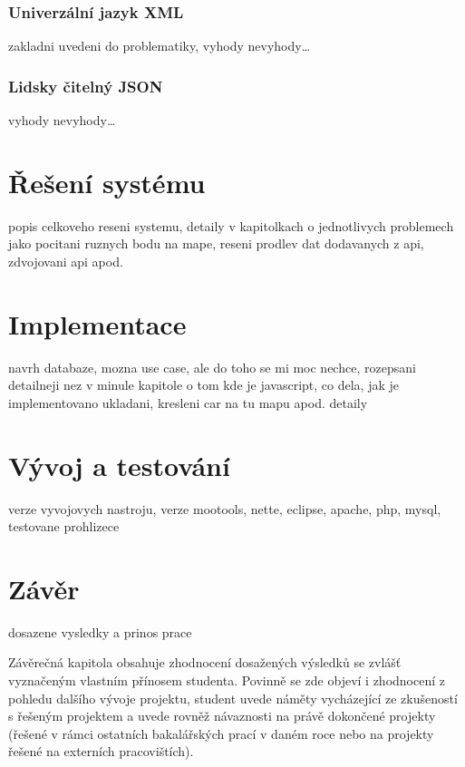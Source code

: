 \subsection{Univerzální jazyk XML}
zakladni uvedeni do problematiky, vyhody nevyhody\ldots
\subsection{Lidsky čitelný JSON}
vyhody nevyhody\ldots

\chapter{Řešení systému}
popis celkoveho reseni systemu, detaily v kapitolkach o jednotlivych
problemech jako pocitani ruznych bodu na mape, reseni prodlev dat
dodavanych z api, zdvojovani api apod.

\chapter{Implementace}
navrh databaze, mozna use case, ale do toho se mi moc nechce,
rozepsani detailneji nez v minule kapitole o tom kde je javascript,
co dela, jak je implementovano ukladani, kresleni car na tu mapu
apod. detaily

\chapter{Vývoj a testování}
verze vyvojovych nastroju, verze mootools, nette, eclipse, apache,
php, mysql, testovane prohlizece

\chapter*{Závěr}
dosazene vysledky a prinos prace

Závěrečná kapitola obsahuje zhodnocení dosažených výsledků se zvlášť
vyznačeným vlastním přínosem studenta. Povinně se zde objeví i
zhodnocení z pohledu dalšího vývoje projektu, student uvede náměty
vycházející ze zkušeností s řešeným projektem a uvede rovněž
návaznosti na právě dokončené projekty (řešené v rámci ostatních
bakalářských prací v daném roce nebo na projekty řešené na externích
pracovištích).
